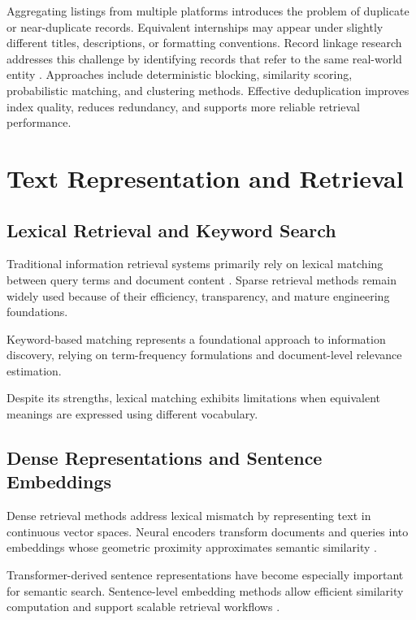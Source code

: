 Aggregating listings from multiple platforms introduces the problem of duplicate or near-duplicate
records. Equivalent internships may appear under slightly different titles, descriptions, or formatting conventions.
Record linkage research addresses this challenge by identifying records that refer to the same
real-world entity \cite{christen2012data, elmagarmid2007duplicate}. Approaches include deterministic blocking, similarity scoring, probabilistic
matching, and clustering methods.
Effective deduplication improves index quality, reduces redundancy, and supports more reliable retrieval performance.

\section{Text Representation and Retrieval}

\subsection{Lexical Retrieval and Keyword Search}

Traditional information retrieval systems primarily rely on lexical matching between query terms and document content \cite{manning2008introduction, robertson2009probabilistic, zobel2006inverted}. Sparse retrieval methods remain widely used because of their efficiency, transparency, and mature engineering foundations.

Keyword-based matching represents a foundational approach to information discovery, relying on term-frequency formulations and document-level relevance estimation.

Despite its strengths, lexical matching exhibits limitations when equivalent meanings are expressed using different vocabulary.

\subsection{Dense Representations and Sentence Embeddings}

Dense retrieval methods address lexical mismatch by representing text in continuous vector spaces. Neural encoders transform documents and queries into embeddings whose geometric proximity approximates semantic similarity \cite{karpukhin2020dense, luan2021sparse}.

Transformer-derived sentence representations have become especially important for semantic search. Sentence-level embedding methods allow efficient similarity computation and support scalable retrieval workflows \cite{reimers2019sentence}.

